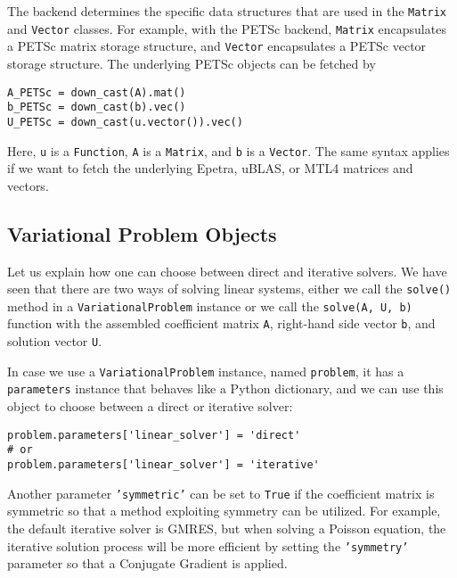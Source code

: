 The backend determines the specific data structures that are
used in the {\fontsize{12pt}{12pt}\texttt{Matrix}} and {\fontsize{12pt}{12pt}\texttt{Vector}} classes. For example,
with the PETSc backend, {\fontsize{12pt}{12pt}\texttt{Matrix}} encapsulates a
PETSc matrix storage structure, and
{\fontsize{12pt}{12pt}\texttt{Vector}} encapsulates a PETSc vector storage structure.
The underlying PETSc objects can be fetched by
\begin{Verbatim}[fontsize=\fontsize{10pt}{10pt},tabsize=8,baselinestretch=1.05,
fontfamily=tt,xleftmargin=7mm]
A_PETSc = down_cast(A).mat()
b_PETSc = down_cast(b).vec()
U_PETSc = down_cast(u.vector()).vec()
\end{Verbatim}
\noindent
Here, {\fontsize{12pt}{12pt}\texttt{u}} is a {\fontsize{12pt}{12pt}\texttt{Function}}, {\fontsize{12pt}{12pt}\texttt{A}} is a {\fontsize{12pt}{12pt}\texttt{Matrix}},
and {\fontsize{12pt}{12pt}\texttt{b}} is a {\fontsize{12pt}{12pt}\texttt{Vector}}.
The same syntax applies if we want to fetch
the underlying Epetra, uBLAS, or MTL4 matrices and vectors.

\subsection{Variational Problem Objects}

Let us explain how one can choose between direct and iterative solvers.
We have seen that there
are two ways of solving linear systems, either we call the {\fontsize{12pt}{12pt}\texttt{solve()}}
method in a {\fontsize{12pt}{12pt}\texttt{VariationalProblem}} instance or we call the {\fontsize{12pt}{12pt}\texttt{solve(A, U, b)}}
function with the assembled coefficient matrix {\fontsize{12pt}{12pt}\texttt{A}}, 
right-hand side vector {\fontsize{12pt}{12pt}\texttt{b}}, and
solution vector {\fontsize{12pt}{12pt}\texttt{U}}. 

In case we use a {\fontsize{12pt}{12pt}\texttt{VariationalProblem}} instance, named {\fontsize{12pt}{12pt}\texttt{problem}},
it has a {\fontsize{12pt}{12pt}\texttt{parameters}} instance that behaves like a Python dictionary,
and we can use this object to choose between a direct or iterative
solver:
\begin{Verbatim}[fontsize=\fontsize{10pt}{10pt},tabsize=8,baselinestretch=1.05,
fontfamily=tt,xleftmargin=7mm]
problem.parameters['linear_solver'] = 'direct'
# or
problem.parameters['linear_solver'] = 'iterative'
\end{Verbatim}
\noindent
Another parameter {\fontsize{12pt}{12pt}\texttt{'symmetric'}} can be set to {\fontsize{12pt}{12pt}\texttt{True}}
if the coefficient matrix is symmetric so that
a method exploiting symmetry can be utilized.
For example, the default iterative solver is GMRES, but when solving
a Poisson equation, the iterative solution process will be more
efficient by setting the {\fontsize{12pt}{12pt}\texttt{'symmetry'}} parameter
so that a Conjugate Gradient is applied.

